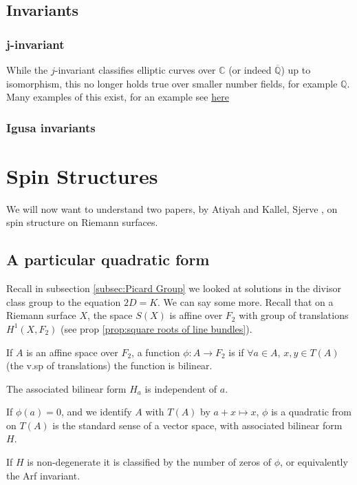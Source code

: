\documentclass{article}
\begin{document}
\subsection{Invariants}
\subsubsection{j-invariant}

\begin{remark}
	While the $j$-invariant classifies elliptic curves over $\mathbb{C}$ (or indeed $\overline{\mathbb{Q}}$) up to isomorphism, this no longer holds true over smaller number fields, for example $\mathbb{Q}$. Many examples of this exist, for an example see \href{https://math.mit.edu/research/highschool/primes/materials/2018/conf/14-2\%20Pentland.pdf}{here}
\end{remark}

\subsubsection{Igusa invariants}

\section{Spin Structures}
We will now want to understand two papers, by Atiyah \cite{Atiyah1971} and Kallel, Sjerve \cite{Kallel2006}, on spin structure on Riemann surfaces. 
\subsection{A particular quadratic form}
Recall in subsection \ref{subsec:Picard Group} we looked at solutions in the divisor class group to the equation $2D=K$. We can say some more. Recall that on a Riemann surface $X$, the space $S(X)$ is affine over $F_2$ with group of translations $H^1(X,F_2)$ (see prop \ref{prop:square roots of line bundles}). 
\begin{definition}
	If $A$ is an affine space over $F_2$, a function $\phi:A \to F_2$ is  if $\forall a \in A, \, x,y \in T(A)$ (the v.sp of translations) the function 
is bilinear. 
\end{definition} 

\begin{lemma}
	The associated bilinear form $H_a$ is independent of $a$. 
\end{lemma}	
If $\phi(a)=0$, and we identify $A$ with $T(A)$ by $a+x \mapsto x$, $\phi$ is a quadratic from on $T(A)$ is the standard sense of a vector space, with associated bilinear form $H$. 
\begin{lemma}
If $H$ is non-degenerate it is classified by the number of zeros of $\phi$, or equivalently the Arf invariant. 
\end{lemma}
\end{document}
